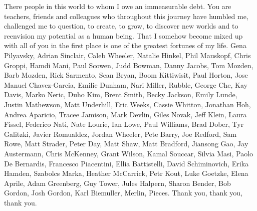 There people in this world to whom I owe an immeasurable debt. You are teachers, friends and colleagues who throughout this journey have humbled me, challenged me to question, to create, to grow, to discover new worlds and to reenvision my potential as a human being. That I somehow become mixed up with all of you in the first place is one of the greatest fortunes of my life.
\newline\newline
Gena Pilyavsky, Adrian Sinclair, Caleb Wheeler, Natalie Hinkel, Phil Mauskopf, Chris Groppi, Hamdi Mani, Paul Scowen, Judd Bowman, Danny Jacobs, Tom Mozden, Barb Mozden, Rick Sarmento, Sean Bryan, Boom Kittiwisit, Paul Horton, Jose Manuel Chavez-Garcia, Emilie Dunham, Nari Miller, Rubble, George Che, Kay Davis, Marko Neric, Duho Kim, Brent Smith, Becky Jackson, Emily Lunde, Justin Mathewson, Matt Underhill, Eric Weeks, Cassie Whitton, Jonathan Hoh, Andrea Aparicio, Tracee Jamison, Mark Devlin, Giles Novak, Jeff Klein, Laura Fissel, Federico Nati, Nate Lourie, Ian Lowe, Paul Williams, Brad Dober, Tyr Galitzki, Javier Romualdez, Jordan Wheeler, Pete Barry, Joe Redford, Sam Rowe, Matt Strader, Peter Day, Matt Shaw, Matt Bradford, Jiansong Gao, Jay Austermann, Chris McKenney, Grant Wilson, Kamal Souccar, Silvia Masi, Paolo De Bernardis, Francesco Piacentini, Ellia Battistelli, David Schiminovich, Erika Hamden, Szabolcs Marka, Heather McCarrick, Petr Kout, Luke Goetzke, Elena Aprile, Adam Greenberg, Guy Tower, Jules Halpern, Sharon Bender, Bob Gordon, Josh Gordon, Karl Biemuller, Merlin, Pieces.
\newline\newline
Thank you, thank you, thank you.
